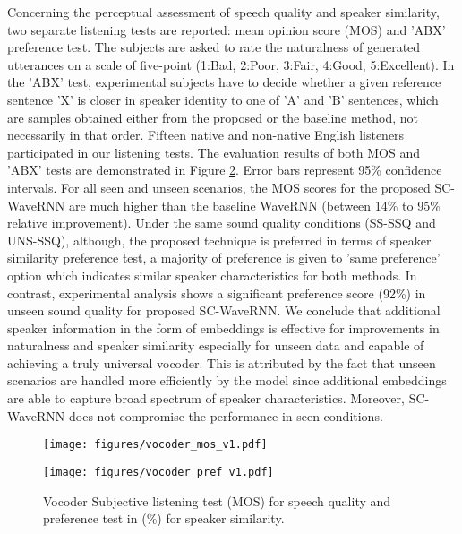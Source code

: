 \documentclass[a4paper]{article}
\begin{document}
Concerning the perceptual assessment of speech quality and speaker similarity, two separate listening tests are reported: mean opinion score (MOS) and 'ABX' preference test. The subjects are asked to rate the naturalness of generated utterances on a scale of five-point (1:Bad, 2:Poor, 3:Fair, 4:Good, 5:Excellent). In the ’ABX’ test, experimental subjects have to decide whether a given reference sentence ’X’ is closer in speaker identity to one of ’A’ and ’B’ sentences, which are samples obtained either from the proposed or the baseline method, not necessarily in that order. Fifteen native and non-native English listeners participated in our listening tests. The evaluation results of both MOS and 'ABX' tests are demonstrated in Figure \ref{vocoder_subjective}. Error bars represent 95\% confidence intervals. For all seen and unseen scenarios, the MOS scores for the proposed SC-WaveRNN are much higher than the baseline WaveRNN (between 14\% to 95\% relative improvement). Under the same sound quality conditions (SS-SSQ and UNS-SSQ), although, the proposed technique is preferred in terms of speaker similarity preference test, a majority of preference is given to ’same preference’ option which indicates similar speaker characteristics for both methods. In contrast, experimental analysis shows a significant preference score (92\%) in unseen sound quality for proposed SC-WaveRNN. We conclude that additional speaker information in the form of embeddings is effective for improvements in naturalness and speaker similarity especially for unseen data and capable of achieving a truly universal vocoder. This is attributed by the fact that unseen scenarios are handled more efficiently by the model since additional embeddings are able to capture broad spectrum of speaker characteristics. Moreover, SC-WaveRNN does not compromise the performance in seen conditions.

\begin{figure}[t!]
  \begin{center}
    \texttt{[image: figures/vocoder\_mos\_v1.pdf]}
    \vspace{-4mm}
  \end{center}
  \vspace{-4mm}
  \label{vocoder_subjective}
\end{figure}

\begin{figure}[t!]
  \begin{center}
  \vspace{-3mm}
    \texttt{[image: figures/vocoder\_pref\_v1.pdf]}
    \vspace{-10mm}
  \end{center}
  \caption{\small Vocoder Subjective listening test (MOS) for speech quality and preference test in (\%) for speaker similarity.}
  \vspace{-5mm}
  \label{vocoder_subjective}
\end{figure}
\end{document}
